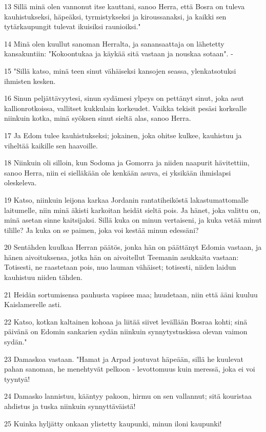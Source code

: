 \par 13 Sillä minä olen vannonut itse kauttani, sanoo Herra, että Bosra on tuleva kauhistukseksi, häpeäksi, tyrmistykseksi ja kiroussanaksi, ja kaikki sen tytärkaupungit tulevat ikuisiksi raunioiksi."
\par 14 Minä olen kuullut sanoman Herralta, ja sanansaattaja on lähetetty kansakuntiin: "Kokoontukaa ja käykää sitä vastaan ja nouskaa sotaan". -
\par 15 "Sillä katso, minä teen sinut vähäiseksi kansojen seassa, ylenkatsotuksi ihmisten kesken.
\par 16 Sinun peljättävyytesi, sinun sydämesi ylpeys on pettänyt sinut, joka asut kallionrotkoissa, vallitset kukkulain korkeudet. Vaikka tekisit pesäsi korkealle niinkuin kotka, minä syöksen sinut sieltä alas, sanoo Herra.
\par 17 Ja Edom tulee kauhistukseksi; jokainen, joka ohitse kulkee, kauhistuu ja viheltää kaikille sen haavoille.
\par 18 Niinkuin oli silloin, kun Sodoma ja Gomorra ja niiden naapurit hävitettiin, sanoo Herra, niin ei sielläkään ole kenkään asuva, ei yksikään ihmislapsi oleskeleva.
\par 19 Katso, niinkuin leijona karkaa Jordanin rantatiheiköstä lakastumattomalle laitumelle, niin minä äkisti karkoitan heidät sieltä pois. Ja hänet, joka valittu on, minä asetan sinne kaitsijaksi. Sillä kuka on minun vertaiseni, ja kuka vetää minut tilille? Ja kuka on se paimen, joka voi kestää minun edessäni?
\par 20 Sentähden kuulkaa Herran päätös, jonka hän on päättänyt Edomia vastaan, ja hänen aivoituksensa, jotka hän on aivoitellut Teemanin asukkaita vastaan: Totisesti, ne raastetaan pois, nuo lauman vähäiset; totisesti, niiden laidun kauhistuu niiden tähden.
\par 21 Heidän sortumisensa pauhusta vapisee maa; huudetaan, niin että ääni kuuluu Kaislamerelle asti.
\par 22 Katso, kotkan kaltainen kohoaa ja liitää siivet levällään Bosraa kohti; sinä päivänä on Edomin sankarien sydän niinkuin synnytystuskissa olevan vaimon sydän."
\par 23 Damaskoa vastaan. "Hamat ja Arpad joutuvat häpeään, sillä he kuulevat pahan sanoman, he menehtyvät pelkoon - levottomuus kuin meressä, joka ei voi tyyntyä!
\par 24 Damasko lannistuu, kääntyy pakoon, hirmu on sen vallannut; sitä kouristaa ahdistus ja tuska niinkuin synnyttäväistä!
\par 25 Kuinka hyljätty onkaan ylistetty kaupunki, minun iloni kaupunki!
